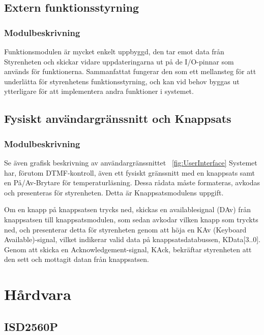 \documentclass[a4paper,11pt]{article}
\begin{document}
	\subsection{Extern funktionsstyrning}

\subsubsection{Modulbeskrivning}

Funktionsmodulen är mycket enkelt uppbyggd, den tar emot data från Styrenheten och skickar vidare 
uppdateringarna ut på de I/O-pinnar som används för funktionerna. Sammanfattat fungerar den som ett
mellansteg för att underlätta för styrenhetens funktionsstyrning, och kan vid behov byggas ut ytterligare
för att implementera andra funktioner i systemet.

	\subsection{Fysiskt användargränssnitt och Knappsats}

\subsubsection{Modulbeskrivning}

Se även grafisk beskrivning av användargränssnittet ~\ref{fig:UserInterface}
Systemet har, förutom DTMF-kontroll, även ett fysiskt gränssnitt med en knappsats samt en På/Av-Brytare för temperaturläsning.
Dessa rådata måste formateras, avkodas och presenteras för styrenheten. Detta är Knappsatsmodulens uppgift.

Om en knapp på knappsatsen trycks ned, skickas en availablesignal (DAv) från knappsatsen till knappsatsmodulen, som sedan
avkodar vilken knapp som tryckts ned, och presenterar detta för styrenheten genom att höja en KAv (Keyboard Available)-signal,
vilket indikerar valid data på knappsatsdatabussen, KData[3..0]. Genom att skicka en Acknowledgement-signal, KAck, bekräftar 
styrenheten att den sett och mottagit datan från knappsatsen.

\section{Hårdvara}

	\subsection{ISD2560P}
\end{document}

